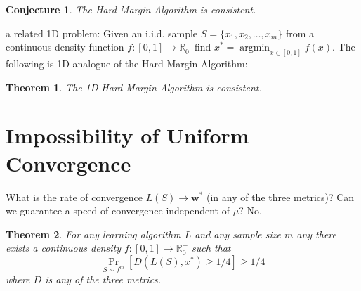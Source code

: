 \documentclass[largefonts,landscape]{sciposter}
\newtheorem*{theorem}{Theorem}
\newtheorem*{conjecture}{Conjecture}
\newcommand{\R}{\mathbb{R}}
\newcommand{\w}{\mathbf{w}}
\DeclareMathOperator*{\argmin}{argmin}
\begin{document}
\begin{multicols}{3}
\vspace{0.8cm}

\begin{conjecture}
The Hard Margin Algorithm is consistent.
\end{conjecture}

\vspace{0.8cm}

 a related 1D problem: Given an i.i.d. sample $S = \{x_1, x_2, \dots, x_m\}$ from a continuous density function $f:[0,1] \to \R_0^+$
find $x^* = \argmin_{x \in [0,1]} f(x)$. The following is 1D analogue of the Hard Margin Algorithm:

\setlength{\fboxrule}{3pt}
\setlength{\fboxsep}{3pt}

\begin{center}
\colorbox[rgb]{0.980,0.820,0.199}{}
\end{center}

\vspace{0.8cm}

\begin{theorem}
The 1D Hard Margin Algorithm is consistent.
\end{theorem}


\section*{Impossibility of Uniform Convergence}

What is the rate of convergence $L(S) \to \w^*$ (in any of the three metrics)?
Can we guarantee a speed of convergence independent of $\mu$? No.

\begin{theorem}
For any learning algorithm $L$ and any sample size $m$ any there exists a continuous density $f:[0,1] \to \R_0^+$ such that
$$
\Pr_{S \sim f^m} \left[ D(L(S), x^*) \ge 1/4  \right] \ge 1/4
$$
where $D$ is any of the three metrics.
\end{theorem}


\end{multicols}
\end{document}
